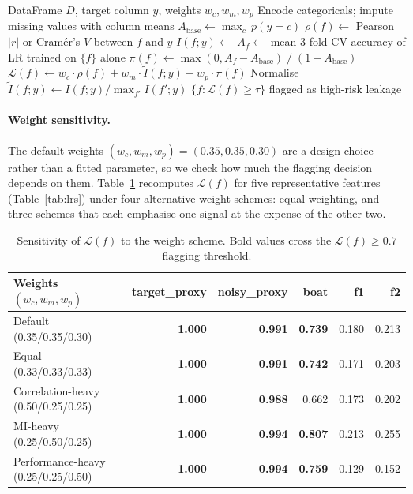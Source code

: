 \documentclass[11pt]{article}
\begin{document}
\begin{algorithm}[!h]
\caption{Unified Leakage Risk Score computation.}
\label{alg:lrs}
\small
\begin{algorithmic}[1]
\Require DataFrame $D$, target column $y$, weights $w_c, w_m, w_p$
\State Encode categoricals; impute missing values with column means
\State $A_{\text{base}} \gets \max_c\, p(y{=}c)$   
  \State $\rho(f) \gets$ Pearson $|r|$ or Cram\'er's $V$ between $f$ and $y$
  \State $I(f;y) \gets$ 
  \State $A_f \gets$ mean 3-fold CV accuracy of LR trained on $\{f\}$ alone
  \State $\pi(f) \gets \max(0, A_f - A_{\text{base}}) \;/\; (1 - A_{\text{base}})$
  \State $\mathcal{L}(f) \gets w_c \cdot \rho(f) + w_m \cdot \widetilde{I}(f;y) + w_p \cdot \pi(f)$
\EndFor
\State Normalise $\widetilde{I}(f;y) \gets I(f;y) / \max_{f'} I(f';y)$
\State \Return $\{ f : \mathcal{L}(f) \ge \tau \}$ flagged as high-risk leakage
\end{algorithmic}
\end{algorithm}

\paragraph{Weight sensitivity.}
The default weights $(w_c, w_m, w_p) = (0.35, 0.35, 0.30)$ are a design choice
rather than a fitted parameter, so we check how much the flagging decision
depends on them.  Table~\ref{tab:lrs_ablation} recomputes $\mathcal{L}(f)$
for five representative features (Table~\ref{tab:lrs}) under four
alternative weight schemes: equal weighting, and three schemes that each
emphasise one signal at the expense of the other two.

\begin{table}[!h]
\centering
\caption{Sensitivity of $\mathcal{L}(f)$ to the weight scheme. Bold values
  cross the $\mathcal{L}(f)\ge0.7$ flagging threshold.}
\label{tab:lrs_ablation}
\scriptsize
\begin{tabular}{lrrrrr}
\toprule
\textbf{Weights $(w_c,w_m,w_p)$} & \textbf{target\_proxy} & \textbf{noisy\_proxy} & \textbf{boat} & \textbf{f1} & \textbf{f2} \\
\midrule
Default (0.35/0.35/0.30)        & \textbf{1.000} & \textbf{0.991} & \textbf{0.739} & 0.180 & 0.213 \\
Equal (0.33/0.33/0.33)          & \textbf{1.000} & \textbf{0.991} & \textbf{0.742} & 0.171 & 0.203 \\
Correlation-heavy (0.50/0.25/0.25) & \textbf{1.000} & \textbf{0.988} & 0.662 & 0.173 & 0.202 \\
MI-heavy (0.25/0.50/0.25)       & \textbf{1.000} & \textbf{0.994} & \textbf{0.807} & 0.213 & 0.255 \\
Performance-heavy (0.25/0.25/0.50) & \textbf{1.000} & \textbf{0.994} & \textbf{0.759} & 0.129 & 0.152 \\
\bottomrule
\end{tabular}
\end{table}
\end{document}
